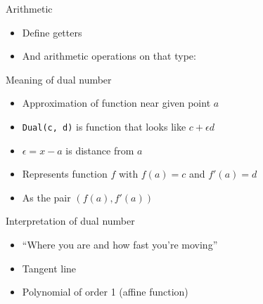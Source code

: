 \begin{frame}[fragile]{Arithmetic}
\protect\hypertarget{arithmetic}{}

\begin{itemize}
\item
  Define getters

\begin{Shaded}
\begin{Highlighting}[]
\end{Highlighting}
\end{Shaded}
\item
  And arithmetic operations on that type:

\begin{Shaded}
\begin{Highlighting}[]

\end{Highlighting}
\end{Shaded}
\end{itemize}

\end{frame}

\begin{frame}[fragile]{Meaning of dual number}
\protect\hypertarget{meaning-of-dual-number}{}

\begin{itemize}
\item
  Approximation of function near given point \(a\)
\item
  \texttt{Dual(c,\ d)} is function that looks like \(c + \epsilon d\)
\item
  \(\epsilon = x - a\) is distance from \(a\)
\item
  Represents function \(f\) with \(f(a) = c\) and \(f'(a) = d\)
\item
  As the pair \((f(a), f'(a))\)
\end{itemize}

\end{frame}

\begin{frame}{Interpretation of dual number}
\protect\hypertarget{interpretation-of-dual-number}{}

\begin{itemize}
\item
  ``Where you are and how fast you're moving''
\item
  Tangent line
\item
  Polynomial of order 1 (affine function)
\end{itemize}

\end{frame}

